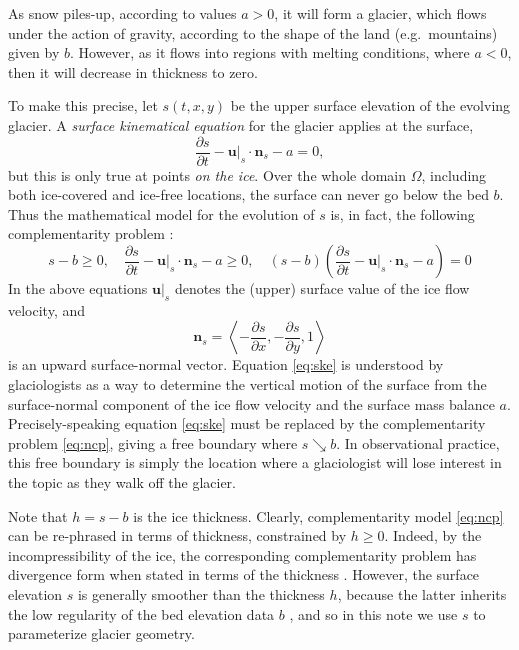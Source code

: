 \documentclass[hidelinks,onefignum,onetabnum,final]{siamart220329}  %
\newcommand{\bn}{\mathbf{n}}
\newcommand{\bu}{\mathbf{u}}
\begin{document}
As snow piles-up, according to values $a>0$, it will form a glacier, which flows under the action of gravity, according to the shape of the land (e.g.~mountains) given by $b$.  However, as it flows into regions with melting conditions, where $a<0$, then it will decrease in thickness to zero.

To make this precise, let $s(t,x,y)$ be the upper surface elevation of the evolving glacier.  A \emph{surface kinematical equation} \cite{GreveBlatter2009} for the glacier applies at the surface,
\begin{equation}
\frac{\partial s}{\partial t} - \bu|_s \cdot \bn_s - a = 0,  \label{eq:ske}
\end{equation}
but this is only true at points \emph{on the ice}.  Over the whole domain $\Omega$, including both ice-covered and ice-free locations, the surface can never go below the bed $b$.  Thus the mathematical model for the evolution of $s$ is, in fact, the following complementarity problem \cite{Calvoetal2003,JouvetBueler2012}:
\begin{equation}
s - b \ge 0, \quad
\frac{\partial s}{\partial t} - \bu|_s \cdot \bn_s - a \ge 0, \quad
(s - b) \left(\frac{\partial s}{\partial t} - \bu|_s \cdot \bn_s - a\right) = 0  \label{eq:ncp}
\end{equation}
In the above equations $\bu|_s$ denotes the (upper) surface value of the ice flow velocity, and
\begin{equation}
\bn_s = \left<-\frac{\partial s}{\partial x}, -\frac{\partial s}{\partial y}, 1\right> \label{eq:normal}
\end{equation}
is an upward surface-normal vector.  Equation \eqref{eq:ske} is understood by glaciologists as a way to determine the vertical motion of the surface from the surface-normal component of the ice flow velocity and the surface mass balance $a$.  Precisely-speaking equation \eqref{eq:ske} must be replaced by the complementarity problem \eqref{eq:ncp}, giving a free boundary where $s \searrow b$.  In observational practice, this free boundary is simply the location where a glaciologist will lose interest in the topic as they walk off the glacier.

Note that $h=s-b$ is the ice thickness.  Clearly, complementarity model \eqref{eq:ncp} can be re-phrased in terms of thickness, constrained by $h\ge 0$.  Indeed, by the incompressibility of the ice, the corresponding complementarity problem has divergence form when stated in terms of the thickness \cite{Bueler2021,JouvetBueler2012}.  However, the surface elevation $s$ is generally smoother than the thickness $h$, because the latter inherits the low regularity of the bed elevation data $b$ \cite{Bueler2025}, and so in this note we use $s$ to parameterize glacier geometry.
\end{document}
